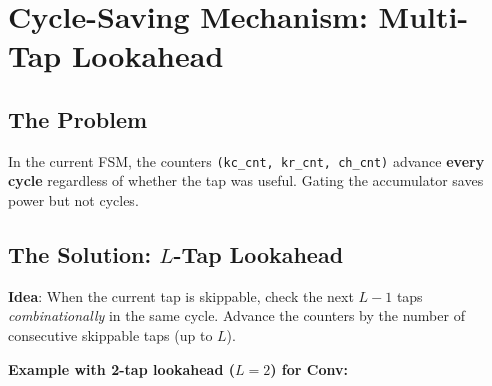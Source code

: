 \documentclass[11pt,a4paper]{article}
\begin{document}
\section{Cycle-Saving Mechanism: Multi-Tap Lookahead}
\label{sec:lookahead}

\subsection{The Problem}

In the current FSM, the counters \texttt{(kc\_cnt, kr\_cnt, ch\_cnt)} advance
\textbf{every cycle} regardless of whether the tap was useful.  Gating the
accumulator saves power but not cycles.

\subsection{The Solution: $L$-Tap Lookahead}

\textbf{Idea}: When the current tap is skippable, check the next $L-1$ taps
\emph{combinationally} in the same cycle.  Advance the counters by the
number of consecutive skippable taps (up to $L$).

\vspace{6pt}
\noindent\textbf{Example with 2-tap lookahead ($L=2$) for Conv:}
\end{document}
